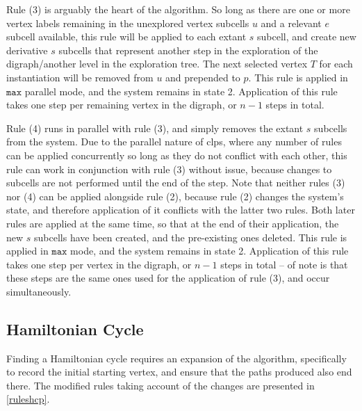 Rule (3) is arguably the heart of the algorithm.  So long as there are one or more vertex labels remaining in the unexplored vertex subcells \(u\) and a relevant \(e\) subcell available, this rule will be applied to each extant \(s\) subcell, and create new derivative \(s\) subcells that represent another step in the exploration of the digraph/another level in the exploration tree.  The next selected vertex \(T\) for each instantiation will be removed from \(u\) and prepended to \(p\).  This rule is applied in \(\mathtt{max}\) parallel mode, and the system remains in state 2.  Application of this rule takes one step per remaining vertex in the digraph, or \(n - 1\) steps in total.

Rule (4) runs in parallel with rule (3), and simply removes the extant \(s\) subcells from the system.  Due to the parallel nature of \gls{clps}, where any number of rules can be applied concurrently so long as they do not conflict with each other, this rule can work in conjunction with rule (3) without issue, because changes to subcells are not performed until the end of the step.  Note that neither rules (3) nor (4) can be applied alongside rule (2), because rule (2) changes the system's state, and therefore application of it conflicts with the latter two rules.  Both later rules are applied at the same time, so that at the end of their application, the new \(s\) subcells have been created, and the pre-existing ones deleted.  This rule is applied in \(\mathtt{max}\) mode, and the system remains in state 2.  Application of this rule takes one step per vertex in the digraph, or \(n - 1\) steps in total -- of note is that these steps are the same ones used for the application of rule (3), and occur simultaneously.

\subsection{Hamiltonian Cycle}
Finding a Hamiltonian cycle requires an expansion of the algorithm, specifically to record the initial starting vertex, and ensure that the paths produced also end there.  The modified rules taking account of the changes are presented in \autoref{ruleshcp}.


